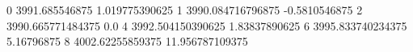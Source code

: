 0 3991.685546875 1.019775390625
1 3990.084716796875 -0.5810546875
2 3990.665771484375 0.0
4 3992.504150390625 1.83837890625
6 3995.833740234375 5.16796875
8 4002.62255859375 11.956787109375
